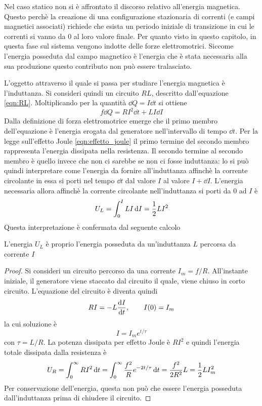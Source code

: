 Nel caso statico non si è affrontato il discorso relativo all'energia magnetica. Questo perchè la creazione
di una configurazione stazionaria di correnti (e campi magnetici associati) richiede che esista
un periodo iniziale di transizione in cui le correnti si vanno da $0$ al loro valore finale. Per quanto
visto in questo capitolo, in questa fase sul sistema vengono indotte delle forze elettromotrici.
Siccome l'energia posseduta dal campo magnetico è l'energia che è stata necessaria alla sua produzione
questo contributo non può essere tralasciato.

L'oggetto attraverso il quale si passa per studiare l'energia magnetica è l'induttanza.
Si consideri quindi un circuito $RL$, descritto dall'equazione \eqref{eqn:RL}. Moltiplicando per la quantità $\dd{Q}=I\dd{t}$ si ottiene
\[
    f\dd{Q}=RI^2\dd{t}+LI\dd{I}
\]
Dalla definizione di forza elettromotrice emerge che il primo membro dell'equazione è l'energia erogata dal
generatore nell'intervallo di tempo $\dd{t}$. Per la legge sull'effetto Joule
\eqref{eqn:effetto_joule} il primo termine del secondo membro rappresenta l'energia dissipata nella resistenza.
Il secondo termine al secondo membro è quello invece che non ci sarebbe se non ci fosse induttanza:
lo si può quindi interpretare come l'energia da fornire all'induttanza affinchè la corrente circolante
in essa si porti nel tempo $\dd{t}$ dal valore $I$ al valore $I+\dd{I}$.
L'energia necessaria allora affinchè la corrente circolante nell'induttanza si porti da $0$ ad $I$ è
\begin{equation}
    U_L=\int_0^I LI\dd{I}=\frac{1}{2}LI^2
    \label{eqn:U_induttore}
\end{equation}
Questa interpretazione è confermata dal seguente calcolo
\begin{obs}
    L'energia $U_L$ è proprio l'energia posseduta da un'induttanza $L$ percorsa da corrente $I$
\end{obs}
\begin{proof}
    Si consideri un circuito percorso da una corrente $I_m=f/R$. All'instante iniziale,
    il generatore viene staccato dal circuito il quale, viene chiuso in corto circuito. L'equazione del circuito è
    diventa quindi
    \[
        RI=-L\dv{I}{t}, \quad\quad I(0)=I_m
    \]
    la cui soluzione è
    \[
        I=I_me^{t/\tau}
    \]
    con $\tau=L/R$. La potenza dissipata per effetto Joule è $RI^2$ e quindi l'energia totale dissipata dalla resistenza è
    \[
        U_R=\int_0^\infty RI^2\dd{t}=\int_0^\infty \frac{f^2}{R}e^{-2t/\tau}\dd{t}=\frac{f^2}{2R^2}L=\frac{1}{2}LI_m^2
    \]
    Per conservazione dell'energia, questa non può che essere l'energia posseduta dall'induttanza prima di chiudere il circuito.
\end{proof}
